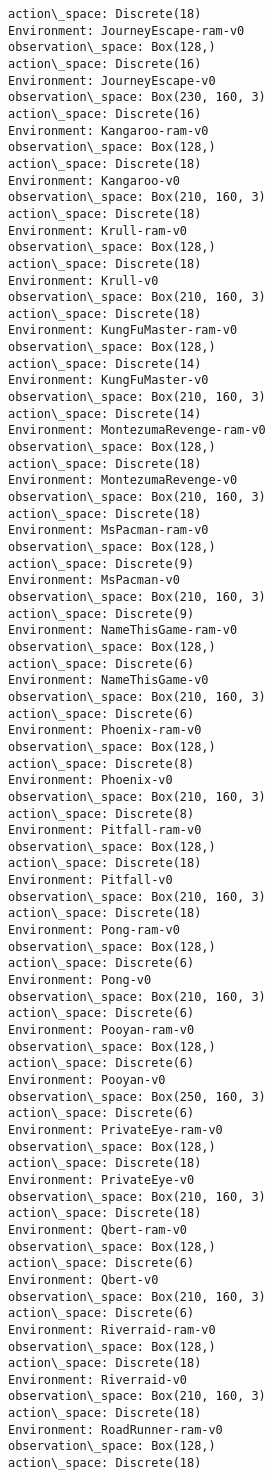 \documentclass[11pt]{article}
\begin{document}
\begin{Verbatim}[commandchars=\\\{\}]
action\_space: Discrete(18)
Environment: JourneyEscape-ram-v0
observation\_space: Box(128,)
action\_space: Discrete(16)
Environment: JourneyEscape-v0
observation\_space: Box(230, 160, 3)
action\_space: Discrete(16)
Environment: Kangaroo-ram-v0
observation\_space: Box(128,)
action\_space: Discrete(18)
Environment: Kangaroo-v0
observation\_space: Box(210, 160, 3)
action\_space: Discrete(18)
Environment: Krull-ram-v0
observation\_space: Box(128,)
action\_space: Discrete(18)
Environment: Krull-v0
observation\_space: Box(210, 160, 3)
action\_space: Discrete(18)
Environment: KungFuMaster-ram-v0
observation\_space: Box(128,)
action\_space: Discrete(14)
Environment: KungFuMaster-v0
observation\_space: Box(210, 160, 3)
action\_space: Discrete(14)
Environment: MontezumaRevenge-ram-v0
observation\_space: Box(128,)
action\_space: Discrete(18)
Environment: MontezumaRevenge-v0
observation\_space: Box(210, 160, 3)
action\_space: Discrete(18)
Environment: MsPacman-ram-v0
observation\_space: Box(128,)
action\_space: Discrete(9)
Environment: MsPacman-v0
observation\_space: Box(210, 160, 3)
action\_space: Discrete(9)
Environment: NameThisGame-ram-v0
observation\_space: Box(128,)
action\_space: Discrete(6)
Environment: NameThisGame-v0
observation\_space: Box(210, 160, 3)
action\_space: Discrete(6)
Environment: Phoenix-ram-v0
observation\_space: Box(128,)
action\_space: Discrete(8)
Environment: Phoenix-v0
observation\_space: Box(210, 160, 3)
action\_space: Discrete(8)
Environment: Pitfall-ram-v0
observation\_space: Box(128,)
action\_space: Discrete(18)
Environment: Pitfall-v0
observation\_space: Box(210, 160, 3)
action\_space: Discrete(18)
Environment: Pong-ram-v0
observation\_space: Box(128,)
action\_space: Discrete(6)
Environment: Pong-v0
observation\_space: Box(210, 160, 3)
action\_space: Discrete(6)
Environment: Pooyan-ram-v0
observation\_space: Box(128,)
action\_space: Discrete(6)
Environment: Pooyan-v0
observation\_space: Box(250, 160, 3)
action\_space: Discrete(6)
Environment: PrivateEye-ram-v0
observation\_space: Box(128,)
action\_space: Discrete(18)
Environment: PrivateEye-v0
observation\_space: Box(210, 160, 3)
action\_space: Discrete(18)
Environment: Qbert-ram-v0
observation\_space: Box(128,)
action\_space: Discrete(6)
Environment: Qbert-v0
observation\_space: Box(210, 160, 3)
action\_space: Discrete(6)
Environment: Riverraid-ram-v0
observation\_space: Box(128,)
action\_space: Discrete(18)
Environment: Riverraid-v0
observation\_space: Box(210, 160, 3)
action\_space: Discrete(18)
Environment: RoadRunner-ram-v0
observation\_space: Box(128,)
action\_space: Discrete(18)

\end{Verbatim}
\end{document}
